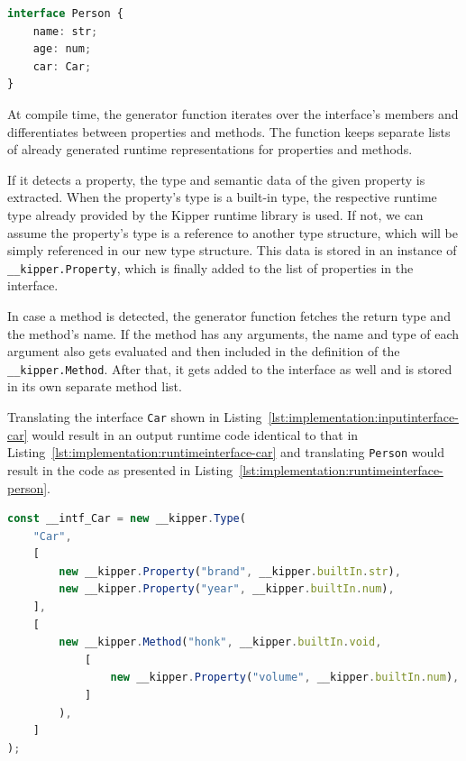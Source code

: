\begin{lstlisting}[language=Typescript,caption=Example interface \lstinline|Person| in the Kipper language including a reference to a different interface,label=lst:implementation:inputinterface-person]
interface Person {
	name: str;
	age: num;
	car: Car;
}
\end{lstlisting}

At compile time, the generator function iterates over the interface's members and differentiates between properties and methods. The function keeps separate lists of already generated runtime representations for properties and methods.

If it detects a property, the type and semantic data of the given property is extracted. When the property's type is a built-in type, the respective runtime type already provided by the Kipper runtime library is used. If not, we can assume the property's type is a reference to another type structure, which will be simply referenced in our new type structure. This data is stored in an instance of \lstinline|__kipper.Property|, which is finally added to the list of properties in the interface.

In case a method is detected, the generator function fetches the return type and the method's name. If the method has any arguments, the name and type of each argument also gets evaluated and then included in the definition of the \lstinline|__kipper.Method|. After that, it gets added to the interface as well and is stored in its own separate method list.

Translating the interface \lstinline|Car| shown in Listing~\ref{lst:implementation:inputinterface-car} would result in an output runtime code identical to that in Listing~\ref{lst:implementation:runtimeinterface-car} and translating \lstinline|Person| would result in the code as presented in Listing~\ref{lst:implementation:runtimeinterface-person}.

\begin{lstlisting}[language=Typescript,caption=The runtime representation of the example interface \lstinline|Car|,label=lst:implementation:runtimeinterface-car]
const __intf_Car = new __kipper.Type(
	"Car",
	[
		new __kipper.Property("brand", __kipper.builtIn.str),
		new __kipper.Property("year", __kipper.builtIn.num),
	],
	[
		new __kipper.Method("honk", __kipper.builtIn.void,
			[
				new __kipper.Property("volume", __kipper.builtIn.num),
			]
		),
	]
);
\end{lstlisting}


